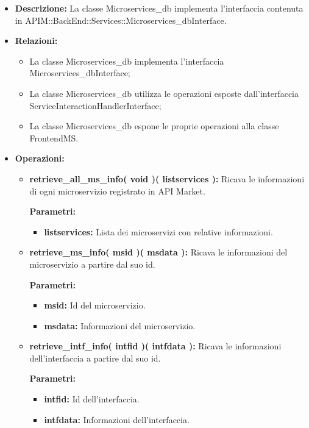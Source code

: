 \begin{itemize}
	\item \textbf{Descrizione:} La classe Microservices\_db implementa l'interfaccia contenuta in APIM::BackEnd::Services::Microservices\_dbInterface.
	\item \textbf{Relazioni:}
		\begin{itemize}
			\item La classe Microservices\_db implementa l'interfaccia Microservices\_dbInterface;
			\item La classe Microservices\_db utilizza le operazioni esposte dall'interfaccia ServiceInteractionHandlerInterface;
			\item La classe Microservices\_db espone le proprie operazioni alla classe FrontendMS.
		\end{itemize}
	\item \textbf{Operazioni:}
		\begin{itemize}
		
			\item \textbf{retrieve\_all\_ms\_info( void )( listservices ):} Ricava le informazioni di ogni microservizio registrato in API Market.
				\begin{description}
    				\item[\textbf{Parametri:}]
				\end{description}
				\begin{itemize}
					\item \textbf{listservices:} Lista dei microservizi con relative informazioni.
				\end{itemize}
				
			\item \textbf{retrieve\_ms\_info( msid )( msdata ):} Ricava le informazioni del microservizio a partire dal suo id.
				\begin{description}
    				\item[\textbf{Parametri:}]
				\end{description}
				\begin{itemize}
					\item \textbf{msid:} Id del microservizio.
					\item \textbf{msdata:} Informazioni del microservizio.
				\end{itemize}
				
			\item \textbf{retrieve\_intf\_info( intfid )( intfdata ):} Ricava le informazioni dell'interfaccia a partire dal suo id.
				\begin{description}
    				\item[\textbf{Parametri:}]
				\end{description}
				\begin{itemize}
					\item \textbf{intfid:} Id dell'interfaccia.
					\item \textbf{intfdata:} Informazioni dell'interfaccia.
				\end{itemize}
				

\end{itemize}
\end{itemize}
